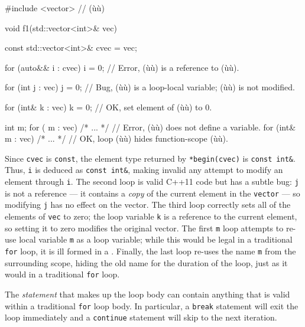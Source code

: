 {{\begin{emcppslisting}
#include <vector>  // (ù{}ù)

void f1(std::vector<int>& vec)
{
    const std::vector<int>& cvec = vec;

    for (auto&& i : cvec)
    {
        i = 0;  // Error, (ù{}ù) is a reference to (ù{}ù).
    }

    for (int j : vec)
    {
        j = 0;  // Bug, (ù{}ù) is a loop-local variable; (ù{}ù) is not modified.
    }

    for (int& k : vec)
    {
        k = 0;  // OK, set element of (ù{}ù) to 0.
    }

    int m;
    for (     m : vec) { /* ... */ }  // Error, (ù{}ù) does not define a variable.
    for (int& m : vec) { /* ... */ }  // OK, loop (ù{}ù) hides function-scope (ù{}ù).
}
\end{emcppslisting}
    

\noindent Since \lstinline!cvec! is \lstinline!const!, the element type returned by
\lstinline!*begin(cvec)! is \lstinline!const!~\lstinline!int&!. Thus, \lstinline!i!
is deduced as \lstinline!const!~\lstinline!int&!, making invalid any attempt
to modify an element through \lstinline!i!. The second loop is valid C++11
code but has a subtle bug: \lstinline!j! is not a reference --- it contains
a \emph{copy} of the current element in the \lstinline!vector! --- so
modifying \lstinline!j! has no effect on the vector. The third loop
correctly sets all of the elements of \lstinline!vec! to zero; the loop
variable \lstinline!k! is a reference to the current element, so setting it
to zero modifies the original vector. The first \lstinline!m! loop attempts
to re-use local variable \lstinline!m! as a loop variable; while this would
be legal in a traditional \lstinline!for! loop, it is ill formed in a
. Finally, the last loop re-uses
the name \lstinline!m! from the surrounding scope, hiding the old name for
the duration of the loop, just as it would in a traditional \lstinline!for!
loop.

The \emph{statement} that makes up the loop body can contain anything
that is valid within a traditional \lstinline!for! loop body. In
particular, a \lstinline!break! statement will exit the loop immediately
and a \lstinline!continue! statement will skip to the next iteration.

}}
